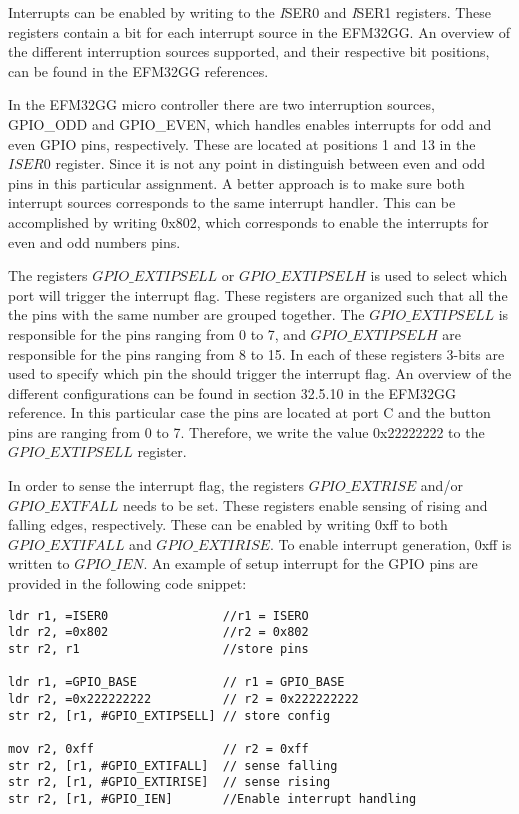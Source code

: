 Interrupts can be enabled by writing to the \emph ISER0 and \emph ISER1 registers. These registers contain a bit for each interrupt source in the EFM32GG. An overview of the different interruption sources supported, and their respective bit positions, can be found in the EFM32GG references\cite[p.12-13]{EFM32GG-rm}. 

In the EFM32GG micro controller there are two interruption sources, GPIO\_ODD and GPIO\_EVEN, which handles enables interrupts for odd and even GPIO pins, respectively. These are located at positions 1 and 13 in the $ISER0$ register. Since it is not any point in distinguish between even and odd pins in this particular assignment. A better approach is to make sure both interrupt sources corresponds to the same interrupt handler. This can be accomplished by writing 0x802, which corresponds to enable the interrupts for even and odd numbers pins.

The registers $GPIO\_EXTIPSELL$ or $GPIO\_EXTIPSELH$ is used to select which port will trigger the interrupt flag. These registers are organized such that all the the pins with the same number are grouped together. The $GPIO\_EXTIPSELL$ is responsible for the pins ranging from 0 to 7, and $GPIO\_EXTIPSELH$ are responsible for the pins ranging from 8 to 15. In each of these registers 3-bits are used to specify which pin the should trigger the interrupt flag. An overview of the different configurations can be found in section 32.5.10 in the EFM32GG reference\cite{EFM32GG-rm}. In this particular case the pins are located at port C and the button pins are ranging from 0 to 7. Therefore, we write the value 0x22222222 to the $GPIO\_EXTIPSELL$ register.

In order to sense the interrupt flag, the registers $GPIO\_EXTRISE$ and/or $GPIO\_EXTFALL$ needs to be set. These registers enable sensing of rising and falling edges, respectively. These can be enabled by writing 0xff to both $GPIO\_EXTIFALL$ and $GPIO\_EXTIRISE$. To enable interrupt generation, 0xff is written to $GPIO\_IEN$. An example of setup interrupt for the GPIO pins are provided in the following code snippet: 

\begin{lstlisting}
ldr r1, =ISER0                //r1 = ISERO
ldr r2, =0x802                //r2 = 0x802  
str r2, r1                    //store pins

ldr r1, =GPIO_BASE            // r1 = GPIO_BASE
ldr r2, =0x222222222          // r2 = 0x222222222
str r2, [r1, #GPIO_EXTIPSELL] // store config

mov r2, 0xff                  // r2 = 0xff 
str r2, [r1, #GPIO_EXTIFALL]  // sense falling
str r2, [r1, #GPIO_EXTIRISE]  // sense rising
str r2, [r1, #GPIO_IEN]       //Enable interrupt handling 

\end{lstlisting}

